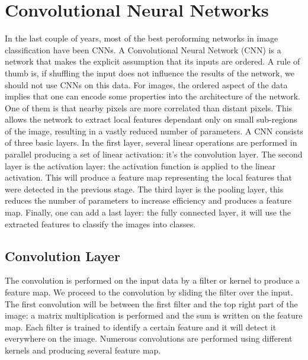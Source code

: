 \section{Convolutional Neural Networks}
In the last couple of years, most of the best peroforming networks in image classification have been CNNs. 
A Convolutional Neural Network (CNN) is a network that makes the explicit assumption that its inputs are ordered. A rule of thumb is, if shuffling the input does not influence the results of the network, we should not use CNNs on this data. For images, the ordered aspect of the data implies that one can encode some properties into the architecture of the network. One of them is that nearby pixels are more correlated than distant pixels. This allows the network to extract local features dependant only on small sub-regions of the image, resulting in a vastly reduced number of parameters. 
A CNN consists of three basic layers.  In the first layer, several linear operations are performed in parallel producing a set of linear activation: it's the convolution layer. The second layer is the activation layer: the activation function is applied to the linear activation. This will produce a feature map representing the local features that were detected in the previous stage. The third layer is the pooling layer, this reduces the number of parameters to increase efficiency and produces a feature map. Finally, one can add a last layer: the fully connected layer, it will use the extracted features to classify the images into classes. 

\subsection{Convolution Layer}

The convolution is performed on the input data by a filter or kernel to produce a feature map. We proceed to the convolution by sliding the filter over the input. The first convolution will be between the first filter and the top right part of the image: a matrix multiplication is performed and the sum is written on the feature map. Each filter is trained to identify a certain feature and it will detect it everywhere on the image.  Numerous convolutions are performed using different kernels and producing several feature map.
	
